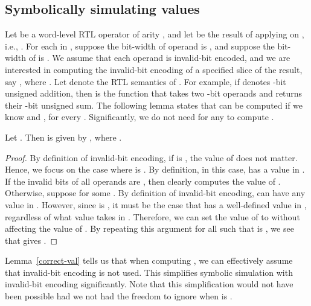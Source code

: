 \documentclass{llncs}
\begin{document}
\subsection{Symbolically simulating values}\label{subsec:sim-val}
Let  be a word-level RTL operator of arity , and let 
be the result of applying  on , i.e.,
.  For each  in , suppose the bit-width of operand  is , and suppose the
bit-width of  is .  We assume that each operand is
invalid-bit encoded, and we are interested in computing the
invalid-bit encoding of a specified slice of the result, say
, where .  
Let  denote the RTL
semantics of .  For example, if  denotes -bit unsigned
addition, then  is the function that takes two
-bit operands and returns their -bit unsigned sum.  The following lemma
states that  can be computed if we know  and , for every .
Significantly, we do not need  for any  to compute .  
\begin{lemma}\label{correct-val}
  Let .  Then  is given by ,
  where .
\end{lemma}
\begin{proof}
  By definition of invalid-bit encoding, if  is
  , the value of  does not matter.  Hence, we
  focus on the case where  is .  By
  definition, in this case,  has a value in .  If the invalid bits of all operands  are
  , then    clearly computes the
  value of .  Otherwise, suppose  for some .  By definition of
  invalid-bit encoding,  can have any value in .
  However, since  is , it must be the case
  that  has a well-defined value in , regardless of what value  takes in .  Therefore, we can set the value of  to
   without affecting the value of .  By
  repeating this argument for all  such that  is
  , we see that  gives
       .
\end{proof}
Lemma~\ref{correct-val} tells us that when computing
, we can effectively assume that invalid-bit
encoding is not used.  This simplifies symbolic simulation with
invalid-bit encoding significantly.  Note that this simplification
would not have been possible had we not had the freedom to ignore
 when  is .
\end{document}
